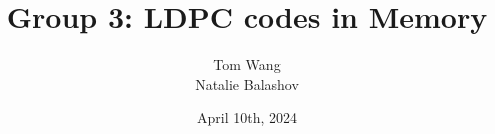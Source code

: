 \documentclass{beamer}
\title{Group 3: LDPC codes in Memory}
\author{Tom Wang \\ Natalie Balashov}
\date{April 10th, 2024}
\begin{document}
\begin{frame}
    \titlepage
\end{frame}

% 
% 
% 
% 
\end{document}
